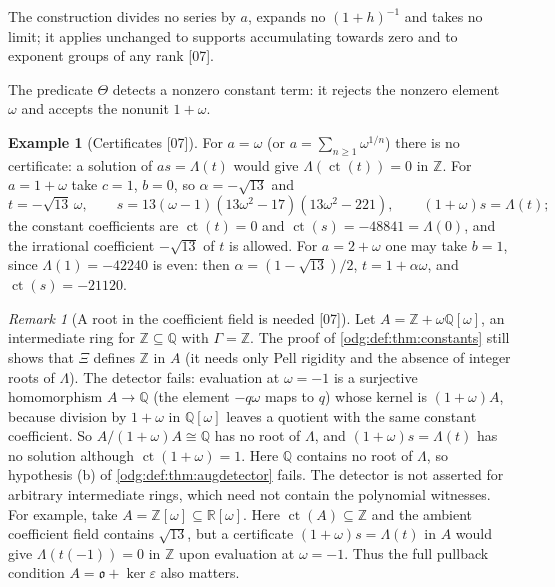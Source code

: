 \documentclass[11pt,oneside]{article}
\numberwithin{equation}{section}
\theoremstyle{definition}
\newtheorem{example}[example]{Example}
\theoremstyle{remark}
\newtheorem{remark}[remark]{Remark}
\newcommand{\Z}{\mathbb Z}
\newcommand{\Q}{\mathbb Q}
\newcommand{\R}{\mathbb R}
\newcommand{\ct}{\operatorname{ct}}
\newcommand{\src}[1]{\textup{\textsf{\small[#1]}}}
\begin{document}
The construction divides no series by $a$, expands no $(1+h)^{-1}$ and takes
no limit; it applies unchanged to supports accumulating towards zero and to
exponent groups of any rank \src{07}.

The predicate $\Theta$ detects a nonzero constant term: it rejects the
nonzero element $\omega$ and accepts the nonunit $1+\omega$.

\begin{example}[Certificates \src{07}]\label{odg:def:ex:certificates}
For $a=\omega$ (or $a=\sum_{n\ge1}\omega^{1/n}$) there is no certificate: a
solution of $as=\Lambda(t)$ would give $\Lambda(\ct(t))=0$ in $\Z$. For
$a=1+\omega$ take $c=1$, $b=0$, so $\alpha=-\sqrt{13}$ and
\[
 t=-\sqrt{13}\,\omega,\qquad s=13(\omega-1)(13\omega^2-17)(13\omega^2-221),
 \qquad (1+\omega)s=\Lambda(t);
\]
the constant coefficients are $\ct(t)=0$ and $\ct(s)=-48841=\Lambda(0)$, and
the irrational coefficient $-\sqrt{13}$ of $t$ is allowed. For $a=2+\omega$ one
may take $b=1$, since $\Lambda(1)=-42240$ is even: then
$\alpha=(1-\sqrt{13})/2$, $t=1+\alpha\omega$, and $\ct(s)=-21120$.
\end{example}

\begin{remark}[A root in the coefficient field is needed \src{07}]\label{odg:def:rem:rootneeded}
Let $A=\Z+\omega\Q[\omega]$, an intermediate ring for $\Z\subseteq\Q$ with
$\Gamma=\Z$. The proof of \cref{odg:def:thm:constants} still shows that $\Xi$
defines $\Z$ in $A$ (it needs only Pell rigidity and the absence of integer
roots of $\Lambda$). The detector fails: evaluation at $\omega=-1$ is a
surjective homomorphism $A\to\Q$ (the element $-q\omega$ maps to $q$) whose
kernel is $(1+\omega)A$, because division by $1+\omega$ in $\Q[\omega]$ leaves
a quotient with the same constant coefficient. So $A/(1+\omega)A\cong\Q$ has no
root of $\Lambda$, and $(1+\omega)s=\Lambda(t)$ has no solution although
$\ct(1+\omega)=1$. Here $\Q$ contains no root of $\Lambda$, so hypothesis (b)
of \cref{odg:def:thm:augdetector} fails. The detector is not asserted for
arbitrary intermediate rings, which need not contain the polynomial
witnesses. For example, take $A=\Z[\omega]\subseteq\R[\omega]$.
Here $\ct(A)\subseteq\Z$ and the ambient coefficient field contains
$\sqrt{13}$, but a certificate $(1+\omega)s=\Lambda(t)$ in $A$ would give
$\Lambda(t(-1))=0$ in $\Z$ upon evaluation at $\omega=-1$. Thus the full
pullback condition $A=\mathfrak o+\ker\varepsilon$ also matters.
\end{remark}
\end{document}
